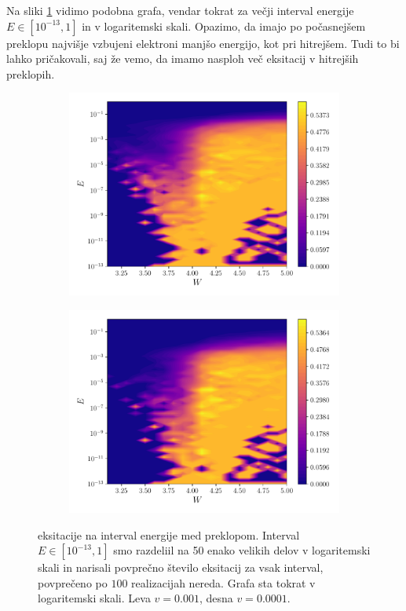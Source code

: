Na sliki \ref{fig:EksBini2} vidimo podobna grafa, vendar tokrat za večji interval energije $E \in [10^{-13},1]$ in v logaritemski skali. Opazimo, da imajo po počasnejšem preklopu najvišje vzbujeni elektroni manjšo energijo, kot pri hitrejšem. Tudi to bi lahko pričakovali, saj že vemo, da imamo nasploh več eksitacij v hitrejših preklopih.
\begin{figure}[H]
\centering
\begin{subfigure}{.49\textwidth}
\includegraphics[width=\linewidth]{Figures/EksBini3.pdf}
\end{subfigure}
\begin{subfigure}{.49\textwidth}
\includegraphics[width=\linewidth]{Figures/EksBini4.pdf}
\end{subfigure}
\caption{eksitacije na interval energije med preklopom. Interval $E \in [10^{-13},1]$ smo razdeliil na 50 enako velikih delov v logaritemski skali in narisali povprečno število eksitacij za vsak interval, povprečeno po $100$ realizacijah nereda. Grafa sta tokrat v logaritemski skali. Leva $v=0.001$, desna $v=0.0001$.}
\label{fig:EksBini2}
\end{figure}


